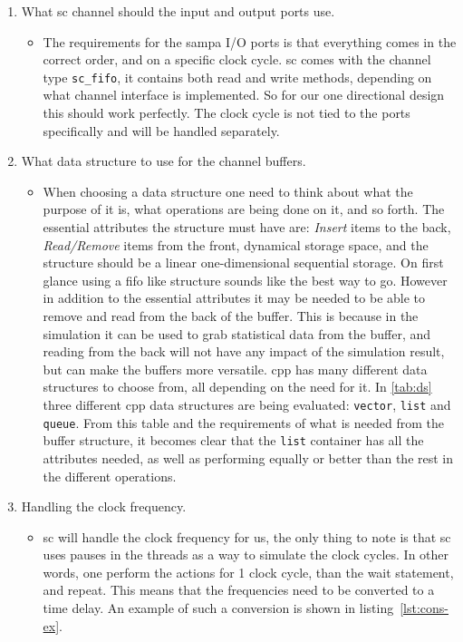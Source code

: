 \documentclass[a4paper, 12pt]{report}
\newcommand{\codeword}[1]{\texttt{#1}}
\begin{document}
\begin{enumerate}
	\item What \gls{sc} channel should the input and output ports use.
	
		\begin{itemize}
		\item The requirements for the \gls{sampa} I/O ports is that everything comes in the correct order, and on a specific clock cycle.
		\gls{sc} comes with the channel type \codeword{sc\_fifo}, it contains both read and write methods, depending on what channel interface is implemented.
		So for our one directional design this should work perfectly.
		The clock cycle is not tied to the ports specifically and will be handled separately.
		\end{itemize}	
		
	\item What data structure to use for the channel buffers.
		\begin{itemize}
\item When choosing a data structure one need to think about what the purpose of it is, what operations are being done on it, and so forth.
		The essential attributes the structure must have are: \textit{Insert} items to the back, \textit{Read/Remove} items from the front, dynamical storage space, and the structure should be a linear one-dimensional sequential storage.
		On first glance using a \gls{fifo} like structure sounds like the best way to go.
		However in addition to the essential attributes it may be needed to be able to remove and read from the back of the buffer.
		This is because in the simulation it can be used to grab statistical data from the buffer, and reading from the back will not have any impact of the simulation result, but can make the buffers more versatile.
		\gls{cpp} has many different data structures to choose from, all depending on the need for it.		
		In \ref{tab:ds} three different \gls{cpp} data structures are being evaluated: \codeword{vector}, \codeword{list} and \codeword{queue}.
		From this table and the requirements of what is needed from the buffer structure, it becomes clear that the \codeword{list} container has all the attributes needed, as well as performing equally or better than the rest in the different operations.
\end{itemize}
		
	
	\item Handling the clock frequency.
		\begin{itemize}
		\item \gls{sc} will handle the clock frequency for us, the only thing to note is that \gls{sc} uses pauses in the threads as a way to simulate the clock cycles.
		In other words, one perform the actions for 1 clock cycle, than the wait statement, and repeat.
		This means that the frequencies need to be converted to a time delay.	
		An example of such a conversion is shown in listing~\ref{lst:cons-ex}.
		\end{itemize}	
	
\end{enumerate}
\end{document}

